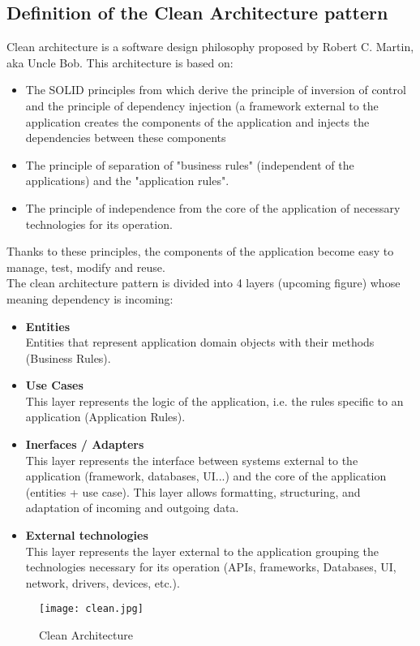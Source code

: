 \subsection{Definition of the Clean Architecture pattern}
Clean architecture is a software design philosophy proposed by Robert C. Martin, aka Uncle Bob. This architecture is based on:
\begin{itemize}
\item The SOLID principles from which derive the principle of inversion of control and the
principle of dependency injection (a framework external to the application
creates the components of the application and injects the dependencies between these
components
\item The principle of separation of "business rules" (independent of the applications) and the "application rules".
\item The principle of independence from the core of the application of necessary technologies
 for its operation.
\end{itemize}
Thanks to these principles, the components of the application become easy to
manage, test, modify and reuse.\\
The clean architecture pattern is divided into 4 layers (upcoming figure) whose meaning
dependency is incoming:
\begin{itemize}
\item \textbf{Entities}\\
Entities that represent application domain objects with
their methods (Business Rules).
\item \textbf{Use Cases}\\
This layer represents the logic of the application, i.e. the rules
specific to an application (Application Rules).
\item \textbf{Inerfaces / Adapters}\\
This layer represents the interface between systems external to the application (framework, databases, UI...) and the core of the application (entities +
use case). This layer allows formatting, structuring, and adaptation of incoming and outgoing data.
\item \textbf{External technologies}\\
This layer represents the layer external to the application grouping the
technologies necessary for its operation (APIs, frameworks, Databases, UI, network, drivers, devices, etc.).
\end{itemize}
\begin{figure}[H]%
    \center   
    \texttt{[image: clean.jpg]}
    \caption{Clean Architecture}
\end{figure}
